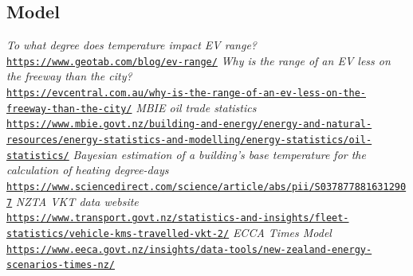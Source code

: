 \documentclass[
]{article}
\begin{document}
\hypertarget{model}{%
\subsection{Model}\label{model}}

\begin{thebibliography}{9}
\textit{To what degree does temperature impact EV range?}
\\\texttt{\url{https://www.geotab.com/blog/ev-range/}}
\textit{Why is the range of an EV less on the freeway than the city?}
\\\texttt{\url{https://evcentral.com.au/why-is-the-range-of-an-ev-less-on-the-freeway-than-the-city/}}
\textit{MBIE oil trade statistics}
\\\texttt{\url{https://www.mbie.govt.nz/building-and-energy/energy-and-natural-resources/energy-statistics-and-modelling/energy-statistics/oil-statistics/}}
\textit{Bayesian estimation of a building's base temperature for the calculation of heating degree-days}
\\\texttt{\url{https://www.sciencedirect.com/science/article/abs/pii/S0378778816312907}}
\textit{NZTA VKT data website}
\\\texttt{\url{https://www.transport.govt.nz/statistics-and-insights/fleet-statistics/vehicle-kms-travelled-vkt-2/}}
\textit{ECCA Times Model}
\\\texttt{\url{https://www.eeca.govt.nz/insights/data-tools/new-zealand-energy-scenarios-times-nz/}}
\end{thebibliography}
\end{document}
